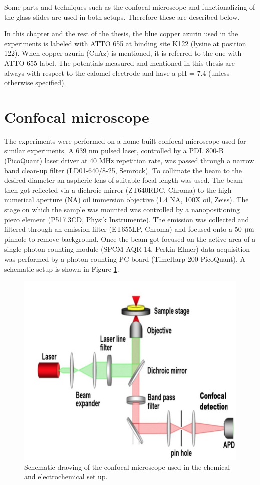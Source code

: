 \documentclass[twoside,single]{lion-msc}
\begin{document}
Some parts and techniques such as the confocal microscope and functionalizing of the glass slides are used in both setups. Therefore these are described below.

In this chapter and the rest of the thesis, the blue copper azurin used in the experiments is  labeled with ATTO 655 at binding site K122 (lysine at position 122). When copper azurin (CuAz) is mentioned, it is referred to the one with ATTO 655 label.
The potentials measured and mentioned in this thesis are always with respect to the calomel electrode and have a pH = 7.4 (unless otherwise specified).


\section*{Confocal microscope}  \label{confo_micro}
The experiments were performed on a home-built confocal microscope used for similar experiments. A 639 nm pulsed laser, controlled by a PDL 800-B (PicoQuant) laser driver at 40 MHz repetition rate, was passed through a narrow band clean-up filter (LD01-640/8-25, Semrock). To collimate the beam to the desired diameter an aspheric lens of suitable focal length was used. The beam then got reflected via a dichroic mirror (ZT640RDC, Chroma) to the high numerical aperture (NA) oil immersion objective (1.4 NA, 100X oil, Zeiss). The stage on which the sample was mounted was controlled by a nanopositioning piezo element (P517.3CD, Physik Instrumente). The emission was collected and filtered through an emission filter (ET655LP, Chroma) and focused onto a 50 $\upmu \textup{m}$ pinhole to remove background. Once the beam got focused on the active area of a single-photon counting module (SPCM-AQR-14, Perkin Elmer) data acquisition was performed by a photon counting PC-board (TimeHarp 200 PicoQuant). A schematic setup is shown in Figure \ref{micros}.

\begin{figure}[ht!]
\centering
\includegraphics[width=\textwidth]{schem_micros}
\caption{Schematic drawing of the confocal microscope used in the chemical and electrochemical set up. }
\label{micros}
\end{figure}
\end{document}
